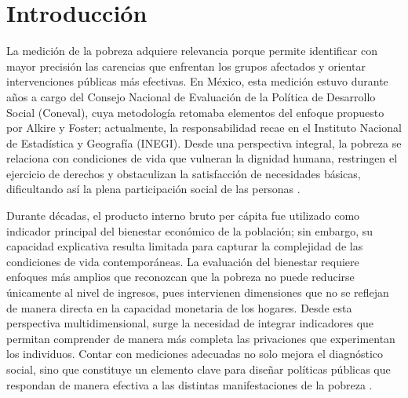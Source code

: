 \documentclass[11pt]{article}
\begin{document}

\section{Introducción}
\label{sec:introduccion}

La medición de la pobreza adquiere relevancia porque permite identificar con mayor precisión las carencias que enfrentan los grupos afectados y orientar intervenciones públicas más efectivas. En México, esta medición estuvo durante años a cargo del Consejo Nacional de Evaluación de la Política de Desarrollo Social (Coneval), cuya metodología retomaba elementos del enfoque propuesto por Alkire y Foster; actualmente, la responsabilidad recae en el Instituto Nacional de Estadística y Geografía (INEGI). Desde una perspectiva integral, la pobreza se relaciona con condiciones de vida que vulneran la dignidad humana, restringen el ejercicio de derechos y obstaculizan la satisfacción de necesidades básicas, dificultando así la plena participación social de las personas \textcite{coneval:2023}.

Durante décadas, el producto interno bruto per cápita fue utilizado como indicador principal del bienestar económico de la población; sin embargo, su capacidad explicativa resulta limitada para capturar la complejidad de las condiciones de vida contemporáneas. La evaluación del bienestar requiere enfoques más amplios que reconozcan que la pobreza no puede reducirse únicamente al nivel de ingresos, pues intervienen dimensiones que no se reflejan de manera directa en la capacidad monetaria de los hogares. Desde esta perspectiva multidimensional, surge la necesidad de integrar indicadores que permitan comprender de manera más completa las privaciones que experimentan los individuos. Contar con mediciones adecuadas no solo mejora el diagnóstico social, sino que constituye un elemento clave para diseñar políticas públicas que respondan de manera efectiva a las distintas manifestaciones de la pobreza \textcite{saenz:2020}.
\end{document}
